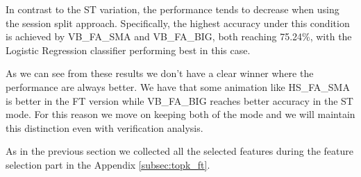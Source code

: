 \documentclass[12pt]{report}
\begin{document}
In contrast to the ST variation, the performance tends to decrease when using the session split approach.
Specifically, the highest accuracy under this condition is achieved by VB\_FA\_SMA and VB\_FA\_BIG, both reaching 75.24\%, with the Logistic Regression classifier performing best in this case.

As we can see from these results we don't have a clear winner where the performance are always better.
We have that some animation like HS\_FA\_SMA is better in the FT version while VB\_FA\_BIG reaches better accuracy in the ST mode.
For this reason we move on keeping both of the mode and we will maintain this distinction even with verification analysis.

As in the previous section we collected all the selected features during the feature selection part in the Appendix \ref{subsec:topk_ft}.
\end{document}
